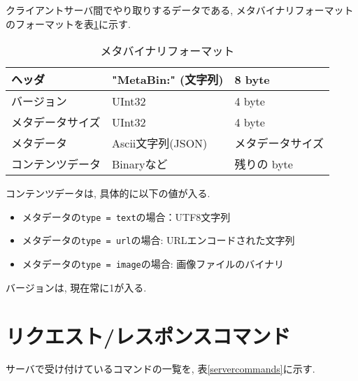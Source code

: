 \documentclass[a4paper,10pt,oneside]{jsbook}
\begin{document}
クライアントサーバ間でやり取りするデータである, メタバイナリフォーマットのフォーマットを表\ref{metabin}に示す.


\begin{table}[htbp]
\begin{center}
\caption{メタバイナリフォーマット}
\label{metabin}
\begin{tabular}{|l|l|l|}
\hline
ヘッダ & "MetaBin:" (文字列) & 8 byte   \\
\hline
バージョン & UInt32 & 4 byte \\
\hline
メタデータサイズ & UInt32 & 4 byte \\
\hline
メタデータ & Ascii文字列(JSON) & メタデータサイズ \\
\hline
コンテンツデータ & Binaryなど & 残りの byte \\
\hline

\end{tabular}
\end{center}
\end{table}

コンテンツデータは, 具体的に以下の値が入る.
\begin{itemize}
\item メタデータの\verb+type = text+の場合：UTF8文字列
\item メタデータの\verb+type = url+の場合: URLエンコードされた文字列
\item メタデータの\verb+type = image+の場合: 画像ファイルのバイナリ
\end{itemize}

バージョンは, 現在常に1が入る.

\section{リクエスト/レスポンスコマンド}

サーバで受け付けているコマンドの一覧を, 表\ref{servercommands}に示す. 
\end{document}
